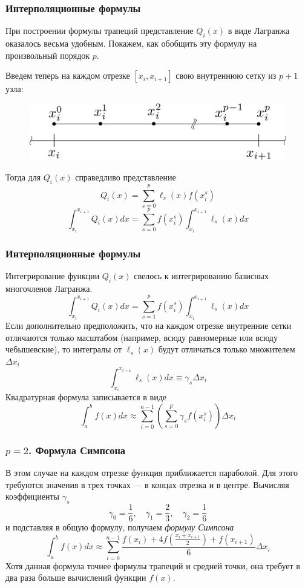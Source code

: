 \documentclass[aspectratio=169,unicode]{beamer}
\begin{document}
\begin{frame}
\frametitle{Интерполяционные формулы}
	При построении формулы трапеций представление $Q_i(x)$ в виде Лагранжа оказалось
	весьма удобным. Покажем, как обобщить эту формулу на произвольный порядок $p$.
	\pause

	Введем теперь на каждом отрезке $[x_i, x_{i+1}]$ свою внутреннюю сетку из
	$p+1$ узла:
	\begin{figure}
	\centering
	\includegraphics[width=.5\textwidth]{subgrid.png}
	\end{figure}
	\pause

	Тогда для $Q_i(x)$ справедливо представление
	\[
	Q_i(x) = \sum_{s=0}^p \ell_s(x) f(x_i^s)
	\]
	\[
	\int_{x_i}^{x_{i+1}} Q_i(x) dx = \sum_{s=0}^p f(x_i^s) \int_{x_i}^{x_{i+1}} \ell_s(x) dx
	\]
\end{frame}

\begin{frame}
\frametitle{Интерполяционные формулы}
	Интегрирование функции $Q_i(x)$ свелось к интегрированию базисных многочленов Лагранжа.
	\[
	\int_{x_i}^{x_{i+1}} Q_i(x) dx = \sum_{s=1}^p f(x_i^s) \int_{x_i}^{x_{i+1}} \ell_s(x) dx
	\]
	\pause
	Если дополнительно предположить, что на каждом отрезке внутренние сетки отличаются только масштабом
	(например, всюду равномерные или всюду чебышевские),
	то интегралы от $\ell_s(x)$ будут отличаться только множителем $\Delta x_i$
	\[
	\int_{x_i}^{x_{i+1}} \ell_s(x) dx \equiv \gamma_s \Delta x_i
	\]
	\pause
	Квадратурная формула записывается в виде
	\[
	\int_a^b f(x) dx \approx \sum_{i=0}^{n-1} \left(\sum_{s=0}^p \gamma_s f(x_i^s)\right)\Delta x_i
	\]
\end{frame}

\begin{frame}
\frametitle{$p=2$. Формула Симпсона}
	В этом случае на каждом отрезке функция приближается параболой. Для этого требуются значения в трех точках ---
	в концах отрезка и в центре. Вычисляя коэффициенты $\gamma_s$
	\[
	\gamma_0 = \frac{1}{6}, \quad \gamma_1 = \frac{2}{3}, \quad \gamma_2 = \frac{1}{6}
	\]
	и подставляя в общую формулу, получаем \emph{формулу Симпсона}
	\[
	\int_a^b f(x) dx \approx \sum_{i=0}^{n-1} \frac{f(x_i) + 4f\left(\frac{x_i+x_{i+1}}{2}\right) + f(x_{i+1})}{6} \Delta x_i
	\]
	Хотя данная формула точнее формулы трапеций и средней точки, она требует в два раза больше вычислений функции $f(x)$.
\end{frame}
\end{document}
